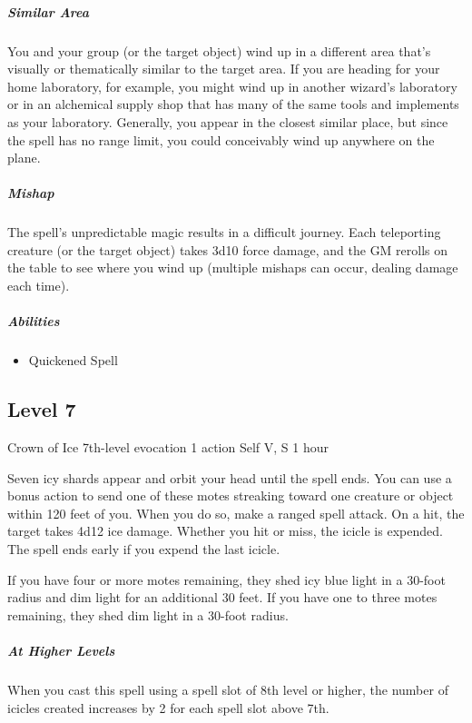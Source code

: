 \documentclass[a4paper,openany,twocolumn]{book}
\begin{document}
\subparagraph*{Similar Area} You and your group (or the target object) wind up in a different area that’s visually or thematically similar to the target area. If you are heading for your home laboratory, for example, you might wind up in another wizard’s laboratory or in an alchemical supply shop that has many of the same tools and implements as your laboratory. Generally, you appear in the closest similar place, but since the spell has no range limit, you could conceivably wind up anywhere on the plane.

\subparagraph*{Mishap} The spell’s unpredictable magic results in a difficult journey. Each teleporting creature (or the target object) takes 3d10 force damage, and the GM rerolls on the table to see where you wind up (multiple mishaps can occur, dealing damage each time).

\subparagraph*{Abilities}
\begin{itemize}
  \item Quickened Spell
\end{itemize}

\subsection*{Level 7}
\DndSpellHeader
  {Crown of Ice}
  {7th-level evocation}
  {1 action}
  {Self}
  {V, S}
  {1 hour}

Seven icy shards appear and orbit your head until the spell ends. You can use a bonus action to send one of these motes streaking toward one creature or object within 120 feet of you. When you do so, make a ranged spell attack. On a hit, the target takes 4d12 ice damage. Whether you hit or miss, the icicle is expended. The spell ends early if you expend the last icicle.

If you have four or more motes remaining, they shed icy blue light in a 30-foot radius and dim light for an additional 30 feet. If you have one to three motes remaining, they shed dim light in a 30-foot radius.

\subparagraph*{At Higher Levels} When you cast this spell using a spell slot of 8th level or higher, the number of icicles created increases by 2 for each spell slot above 7th.
\end{document}
